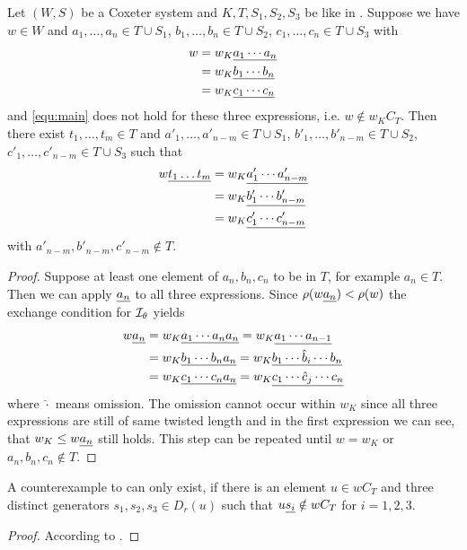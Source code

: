\begin{prop}
\label{prop:counterexample-simplification}
Let $(W,S)$ be a Coxeter system and $K,T,S_1,S_2,S_3$ be like in
. Suppose we have $w \in W$ and $a_1,\ldots,a_n \in T \cup
S_1$, $b_1,\ldots,b_n \in T \cup S_2$, $c_1,\ldots,c_n \in T \cup S_3$ with
\begin{align*}
w & = w_K \underline{ a_1 \cdots a_n } \\
  & = w_K \underline{ b_1 \cdots b_n } \\
  & = w_K \underline{ c_1 \cdots c_n }
\end{align*}
and \eqref{equ:main} does not hold for these three expressions, i.e. $w
\notin w_K C_T$.
Then there exist $t_1,\ldots,t_m \in T$ and $a'_1,\ldots,a'_{n-m} \in T \cup S_1$,
$b'_1,\ldots,b'_{n-m} \in T \cup S_2$, $c'_1,\ldots,c'_{n-m} \in T \cup S_3$ such that
\begin{align*}
w \underline{t_1 \ldots t_m} & = w_K \underline{ a'_1 \cdots a'_{n-m} } \\
                       & = w_K \underline{ b'_1 \cdots b'_{n-m} } \\
                       & = w_K \underline{ c'_1 \cdots c'_{n-m} }
\end{align*}
with $a'_{n-m},b'_{n-m},c'_{n-m} \notin T$.

\begin{proof}
Suppose at least one element of $a_n,b_n,c_n$ to be in $T$, for example $a_n \in T$.
Then we can apply $\underline{a_n}$ to all three expressions. Since $\rho (w \underline{a_n}) < \rho(w)$
the exchange condition for $\mathcal{I}_{\theta}$ \cite[Proposition 3.10]{hultman:comb-twisted-invo}
yields
\begin{align*}
w \underline{a_n} & = w_K \underline{ a_1 \cdots a_n a_n } = w_K \underline{ a_1 \cdots a_{n-1} } \\
           & = w_K \underline{ b_1 \cdots b_n a_n } = w_K \underline{ b_1 \cdots \hat b_i \cdots b_n } \\
           & = w_K \underline{ c_1 \cdots c_n a_n } = w_K \underline{ c_1 \cdots \hat c_j \cdots c_n }
\end{align*}
where $\hat \cdot$ means omission. The omission cannot occur within $w_K$ since all three
expressions are still of same twisted length and in the first expression we can see, that
$w_K \leq w \underline{a_n}$ still holds. This step can be repeated until $w = w_K$ or
$a_n,b_n,c_n \notin T$.
\end{proof}
\end{prop}

\begin{lemm}
\label{lemm:counterexample-simplification}
A counterexample to  can only exist, if there
is an element $u \in w C_T$ and three distinct generators $s_1,s_2,s_3 \in
D_r(u)$ such that $u \underline{s_i} \notin w C_T$ for $i=1,2,3$.

\begin{proof}
According to .
\end{proof}
\end{lemm}

